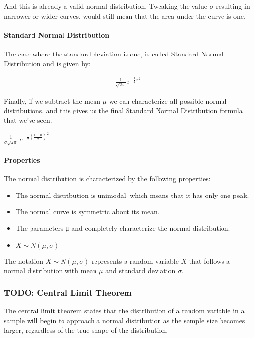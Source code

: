 \documentclass[11pt]{article}
\begin{document}
And this is already a valid normal distribution. Tweaking the value
\(\sigma\) resulting in narrower or wider curves, would still mean that
the area under the curve is one.

\hypertarget{standard-normal-distribution}{%
\paragraph{Standard Normal Distribution}\label{standard-normal-distribution}}
The case where the standard deviation is one, is called Standard
Normal Distribution and is given by:

\begin{gather}
  \frac{1}{\sqrt{2\pi}} e^{-\frac{1}{2}x^2}
\end{gather}

Finally, if we subtract the mean \(\mu\) we can characterize all
possible normal distributions, and this gives us the final Standard Normal Distribution 
formula that we've seen.

\begin{center}
  \(\frac{1}{\sigma \sqrt{2\pi}} \ e^{-\frac{1}{2}(\frac{x - \mu }{\sigma})^2}\)
\end{center}

\hypertarget{properties-of-the-normal-distribution}{%
\paragraph{Properties}\label{properties-of-the-normal-distribution}}

The normal distribution is characterized by the following properties:
\begin{itemize}
\item The normal distribution is unimodal, which means that it has only one peak.
\item The normal curve is symmetric about its mean.
\item The parameters μ and \sigma completely characterize the normal distribution.
\item \(X \sim N(\mu,\sigma)\)
\end{itemize}

The notation \(X \sim N(\mu,\sigma)\) represents a random variable \(X\) that follows
a normal distribution with mean \(\mu\) and standard deviation \(\sigma\).

\hypertarget{central-limit-theorem}{%
\subsubsection{TODO: Central Limit Theorem}\label{central-limit-theorem}}
The central limit theorem states that the distribution of a random
variable in a sample will begin to approach a normal distribution as the
sample size becomes larger, regardless of the true shape of the
distribution.
\end{document}
